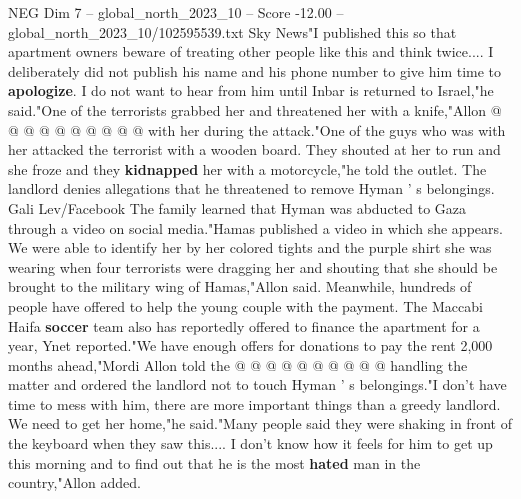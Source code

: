 \begin{textsample}{NEG Dim 7 – global\_north\_2023\_10 – Score -12.00 – global\_north\_2023\_10/102595539.txt}
Sky News"I published this so that apartment owners beware of treating other people like this and think twice....
I deliberately did not publish his name and his phone number to give him time to \textbf{apologize}.
I do not want to hear from him until Inbar is returned to Israel,"he said."One of the terrorists grabbed her and threatened her with a knife,"Allon @ @ @ @ @ @ @ @ @ @ with her during the attack."One of the guys who was with her attacked the terrorist with a wooden board.
They shouted at her to run and she froze and they \textbf{kidnapped} her with a motorcycle,"he told the outlet.
The landlord denies allegations that he threatened to remove Hyman ' s belongings.
Gali Lev/Facebook The family learned that Hyman was abducted to Gaza through a video on social media."Hamas published a video in which she appears.
We were able to identify her by her colored tights and the purple shirt she was wearing when four terrorists were dragging her and shouting that she should be brought to the military wing of Hamas,"Allon said.
Meanwhile, hundreds of people have offered to help the young couple with the payment.
The Maccabi Haifa \textbf{soccer} team also has reportedly offered to finance the apartment for a year, Ynet reported."We have enough offers for donations to pay the rent 2,000 months ahead,"Mordi Allon told the @ @ @ @ @ @ @ @ @ @ handling the matter and ordered the landlord not to touch Hyman ' s belongings."I don't have time to mess with him, there are more important things than a greedy landlord.
We need to get her home,"he said."Many people said they were shaking in front of the keyboard when they saw this....
I don't know how it feels for him to get up this morning and to find out that he is the most \textbf{hated} man in the country,"Allon added.

\end{textsample}
